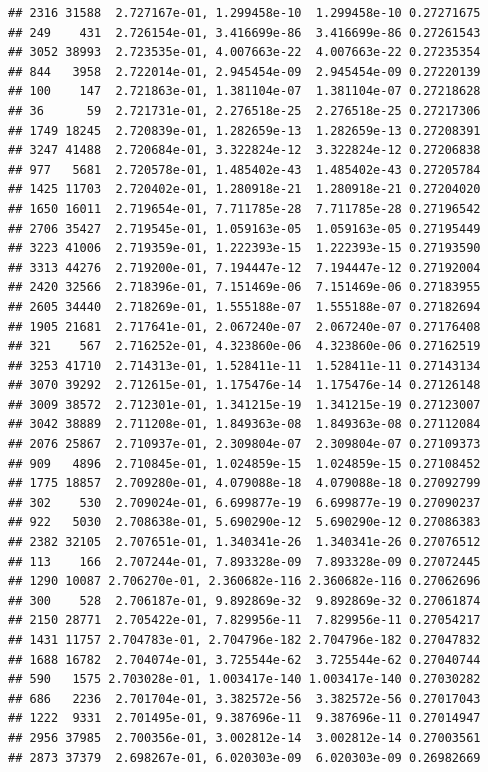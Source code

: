 \documentclass[
]{article}
\begin{document}
\begin{verbatim}
## 2316 31588  2.727167e-01, 1.299458e-10  1.299458e-10 0.27271675
## 249    431  2.726154e-01, 3.416699e-86  3.416699e-86 0.27261543
## 3052 38993  2.723535e-01, 4.007663e-22  4.007663e-22 0.27235354
## 844   3958  2.722014e-01, 2.945454e-09  2.945454e-09 0.27220139
## 100    147  2.721863e-01, 1.381104e-07  1.381104e-07 0.27218628
## 36      59  2.721731e-01, 2.276518e-25  2.276518e-25 0.27217306
## 1749 18245  2.720839e-01, 1.282659e-13  1.282659e-13 0.27208391
## 3247 41488  2.720684e-01, 3.322824e-12  3.322824e-12 0.27206838
## 977   5681  2.720578e-01, 1.485402e-43  1.485402e-43 0.27205784
## 1425 11703  2.720402e-01, 1.280918e-21  1.280918e-21 0.27204020
## 1650 16011  2.719654e-01, 7.711785e-28  7.711785e-28 0.27196542
## 2706 35427  2.719545e-01, 1.059163e-05  1.059163e-05 0.27195449
## 3223 41006  2.719359e-01, 1.222393e-15  1.222393e-15 0.27193590
## 3313 44276  2.719200e-01, 7.194447e-12  7.194447e-12 0.27192004
## 2420 32566  2.718396e-01, 7.151469e-06  7.151469e-06 0.27183955
## 2605 34440  2.718269e-01, 1.555188e-07  1.555188e-07 0.27182694
## 1905 21681  2.717641e-01, 2.067240e-07  2.067240e-07 0.27176408
## 321    567  2.716252e-01, 4.323860e-06  4.323860e-06 0.27162519
## 3253 41710  2.714313e-01, 1.528411e-11  1.528411e-11 0.27143134
## 3070 39292  2.712615e-01, 1.175476e-14  1.175476e-14 0.27126148
## 3009 38572  2.712301e-01, 1.341215e-19  1.341215e-19 0.27123007
## 3042 38889  2.711208e-01, 1.849363e-08  1.849363e-08 0.27112084
## 2076 25867  2.710937e-01, 2.309804e-07  2.309804e-07 0.27109373
## 909   4896  2.710845e-01, 1.024859e-15  1.024859e-15 0.27108452
## 1775 18857  2.709280e-01, 4.079088e-18  4.079088e-18 0.27092799
## 302    530  2.709024e-01, 6.699877e-19  6.699877e-19 0.27090237
## 922   5030  2.708638e-01, 5.690290e-12  5.690290e-12 0.27086383
## 2382 32105  2.707651e-01, 1.340341e-26  1.340341e-26 0.27076512
## 113    166  2.707244e-01, 7.893328e-09  7.893328e-09 0.27072445
## 1290 10087 2.706270e-01, 2.360682e-116 2.360682e-116 0.27062696
## 300    528  2.706187e-01, 9.892869e-32  9.892869e-32 0.27061874
## 2150 28771  2.705422e-01, 7.829956e-11  7.829956e-11 0.27054217
## 1431 11757 2.704783e-01, 2.704796e-182 2.704796e-182 0.27047832
## 1688 16782  2.704074e-01, 3.725544e-62  3.725544e-62 0.27040744
## 590   1575 2.703028e-01, 1.003417e-140 1.003417e-140 0.27030282
## 686   2236  2.701704e-01, 3.382572e-56  3.382572e-56 0.27017043
## 1222  9331  2.701495e-01, 9.387696e-11  9.387696e-11 0.27014947
## 2956 37985  2.700356e-01, 3.002812e-14  3.002812e-14 0.27003561
## 2873 37379  2.698267e-01, 6.020303e-09  6.020303e-09 0.26982669

\end{verbatim}
\end{document}
